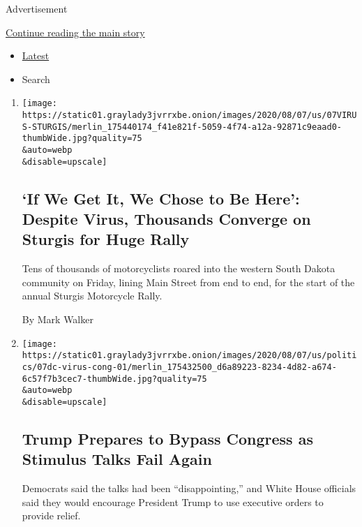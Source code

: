 Advertisement

\protect\hyperlink{after-mid1}{Continue reading the main story}

\begin{itemize}
\tightlist
\item
  \protect\hyperlink{stream-panel}{Latest}
\item
  Search
\end{itemize}

\begin{enumerate}
\def\labelenumi{\arabic{enumi}.}
\item
  \href{/2020/08/07/us/sturgis-motorcyle-rally.html}{}

  \texttt{[image: https://static01.graylady3jvrrxbe.onion/images/2020/08/07/us/07VIRUS-STURGIS/merlin\_175440174\_f41e821f-5059-4f74-a12a-92871c9eaad0-thumbWide.jpg?quality=75\\\&auto=webp\\\&disable=upscale]}

  \hypertarget{if-we-get-it-we-chose-to-be-here-despite-virus-thousands-converge-on-sturgis-for-huge-rally}{%
  \subsection{`If We Get It, We Chose to Be Here': Despite Virus,
  Thousands Converge on Sturgis for Huge
  Rally}\label{if-we-get-it-we-chose-to-be-here-despite-virus-thousands-converge-on-sturgis-for-huge-rally}}

  Tens of thousands of motorcyclists roared into the western South
  Dakota community on Friday, lining Main Street from end to end, for
  the start of the annual Sturgis Motorcycle Rally.

  By Mark Walker
\item
  \href{/2020/08/07/us/politics/trump-congress-stimulus.html}{}

  \texttt{[image: https://static01.graylady3jvrrxbe.onion/images/2020/08/07/us/politics/07dc-virus-cong-01/merlin\_175432500\_d6a89223-8234-4d82-a674-6c57f7b3cec7-thumbWide.jpg?quality=75\\\&auto=webp\\\&disable=upscale]}

  \hypertarget{trump-prepares-to-bypass-congress-as-stimulus-talks-fail-again}{%
  \subsection{Trump Prepares to Bypass Congress as Stimulus Talks Fail
  Again}\label{trump-prepares-to-bypass-congress-as-stimulus-talks-fail-again}}

  Democrats said the talks had been ``disappointing,'' and White House
  officials said they would encourage President Trump to use executive
  orders to provide relief.


\end{enumerate}
